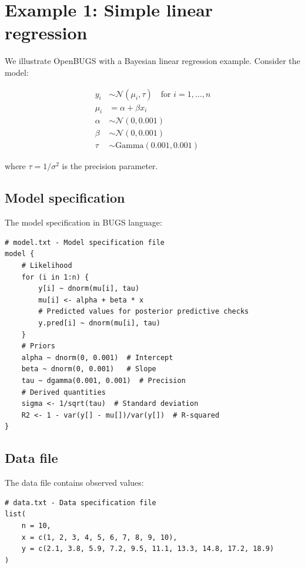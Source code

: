 \section{Example 1: Simple linear regression}

We illustrate OpenBUGS with a Bayesian linear regression example. Consider the model:

\begin{align}
y_i &\sim \mathcal{N}(\mu_i, \tau) \quad \text{for } i = 1, \ldots, n \\
\mu_i &= \alpha + \beta x_i \\
\alpha &\sim \mathcal{N}(0, 0.001) \\
\beta &\sim \mathcal{N}(0, 0.001) \\
\tau &\sim \text{Gamma}(0.001, 0.001)
\end{align}

where $\tau = 1/\sigma^2$ is the precision parameter.

\subsection{Model specification}

The model specification in BUGS language:
\begin{codebox}
\begin{verbatim}
# model.txt - Model specification file
model {
    # Likelihood
    for (i in 1:n) {
        y[i] ~ dnorm(mu[i], tau)
        mu[i] <- alpha + beta * x
        # Predicted values for posterior predictive checks
        y.pred[i] ~ dnorm(mu[i], tau)
    }
    # Priors
    alpha ~ dnorm(0, 0.001)  # Intercept
    beta ~ dnorm(0, 0.001)   # Slope
    tau ~ dgamma(0.001, 0.001)  # Precision
    # Derived quantities
    sigma <- 1/sqrt(tau)  # Standard deviation
    R2 <- 1 - var(y[] - mu[])/var(y[])  # R-squared
}
\end{verbatim}
\end{codebox}

\subsection{Data file}

The data file contains observed values:
\begin{codebox}
\begin{verbatim}
# data.txt - Data specification file
list(
    n = 10,
    x = c(1, 2, 3, 4, 5, 6, 7, 8, 9, 10),
    y = c(2.1, 3.8, 5.9, 7.2, 9.5, 11.1, 13.3, 14.8, 17.2, 18.9)
)
\end{verbatim}
\end{codebox}


